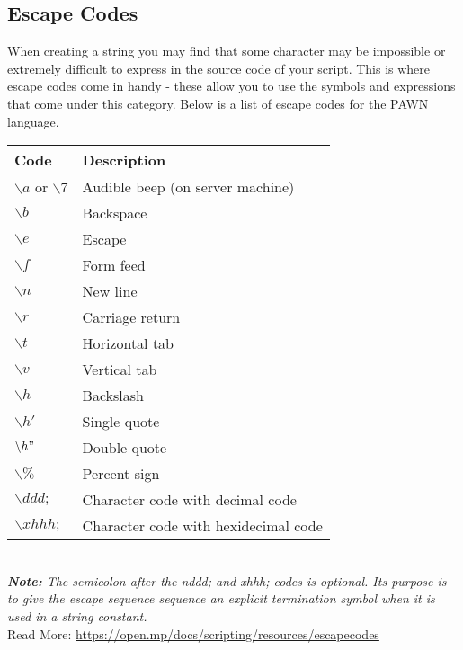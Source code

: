 \documentclass{article}
\begin{document}
\subsection{Escape Codes}
\begin{sloppypar}
When creating a string you may find that some character may be impossible or extremely difficult to express in the source code of your script. This is where escape codes come in handy - these allow you to use the symbols and expressions that come under this category. Below is a list of escape codes for the PAWN language.
\end{sloppypar}
\bigskip
\noindent\begin{tabular}{ |l|l| }
\hline
Code & Description \\
\hline
$\backslash a$ or $\backslash 7$ & Audible beep (on server machine) \\
$\backslash b$ & Backspace \\
$\backslash e$ & Escape \\
$\backslash f$ & Form feed \\
$\backslash n$ & New line \\
$\backslash r$ & Carriage return \\
$\backslash t$ & Horizontal tab \\
$\backslash v$ & Vertical tab \\
$\backslash h$ & Backslash \\
$\backslash h'$ & Single quote \\
$\backslash h"$ & Double quote \\
$\backslash \%$ & Percent sign \\
$\backslash ddd;$ & Character code with decimal code \\
$\backslash xhhh;$ & Character code with hexidecimal code \\
\hline
\end{tabular}
\bigskip
\\\textit{\textbf{Note:} The semicolon after the nddd; and xhhh; codes is optional. Its purpose is to give the escape sequence sequence an explicit termination symbol when it is used in a string constant.}
\bigskip
\\Read More: \url{https://open.mp/docs/scripting/resources/escapecodes}


\newpage
\end{document}
